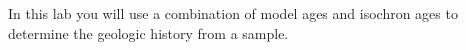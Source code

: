 In this lab you will use a combination of model ages and isochron ages to determine the geologic history from a sample.